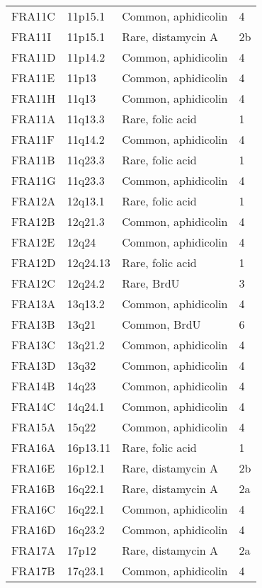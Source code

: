 \documentclass[phd,tocprelim]{cornell}
\begin{document}
\begin{center}
\begin{longtable}{|l|l|l|l|}
     FRA11C & 11p15.1  & Common, aphidicolin   & 4 \\
     FRA11I & 11p15.1  & Rare, distamycin A  & 2b \\
     FRA11D & 11p14.2  & Common, aphidicolin   & 4 \\
     FRA11E & 11p13    & Common, aphidicolin   & 4 \\
     FRA11H & 11q13    & Common, aphidicolin   & 4 \\
     FRA11A & 11q13.3  & Rare, folic acid    & 1 \\
     FRA11F & 11q14.2  & Common, aphidicolin   & 4 \\
     FRA11B & 11q23.3  & Rare, folic acid    & 1 \\
     FRA11G & 11q23.3  & Common, aphidicolin   & 4 \\
     FRA12A & 12q13.1  & Rare, folic acid    & 1 \\
     FRA12B & 12q21.3  & Common, aphidicolin   & 4 \\
     FRA12E & 12q24    & Common, aphidicolin   & 4 \\
     FRA12D & 12q24.13 & Rare, folic acid    & 1 \\
     FRA12C & 12q24.2  & Rare, BrdU          & 3 \\
     FRA13A & 13q13.2  & Common, aphidicolin   & 4 \\
     FRA13B & 13q21    & Common, BrdU          & 6 \\
     FRA13C & 13q21.2  & Common, aphidicolin   & 4 \\
     FRA13D & 13q32    & Common, aphidicolin   & 4 \\
     FRA14B & 14q23    & Common, aphidicolin   & 4 \\
     FRA14C & 14q24.1  & Common, aphidicolin   & 4 \\
     FRA15A & 15q22    & Common, aphidicolin   & 4 \\
     FRA16A & 16p13.11 & Rare, folic acid    & 1 \\
     FRA16E & 16p12.1  & Rare, distamycin A  & 2b \\
     FRA16B & 16q22.1  & Rare, distamycin A  & 2a \\
     FRA16C & 16q22.1  & Common, aphidicolin   & 4 \\
     FRA16D & 16q23.2  & Common, aphidicolin   & 4 \\
     FRA17A & 17p12    & Rare, distamycin A  & 2a \\
     FRA17B & 17q23.1  & Common, aphidicolin   & 4 \\

\end{longtable}
\end{center}
\end{document}
